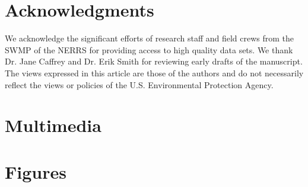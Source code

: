 \documentclass[letterpaper,12pt,oneside]{article}\usepackage[]{graphicx}\usepackage[]{color}
\begin{document}
\clearpage
\begin{singlespace}


\end{singlespace}
\clearpage

\section{Acknowledgments}

We acknowledge the significant efforts of research staff and field crews from the \acl{SWMP} of the \acl{NERRS} for providing access to high quality data sets.  We thank Dr. Jane Caffrey and Dr. Erik Smith for reviewing early drafts of the manuscript. The views expressed in this article are those of the authors and do not necessarily reflect the views or policies of the U.S. Environmental Protection Agency.


\section{Multimedia} \label{multi}

\clearpage


\section{Figures}
\end{document}
